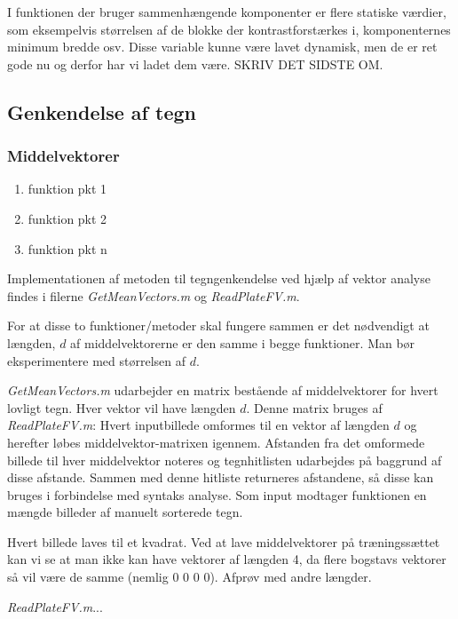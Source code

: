 I funktionen der bruger sammenhængende komponenter er flere statiske værdier, som eksempelvis størrelsen af de blokke der kontrastforstærkes i, komponenternes minimum bredde osv. Disse variable kunne være lavet dynamisk, men de er ret gode nu og derfor har vi ladet dem være. SKRIV DET SIDSTE OM.



\subsection{Genkendelse af tegn}

\subsubsection{Middelvektorer}

\begin{enumerate}
\item funktion pkt 1
\item funktion pkt 2
\item funktion pkt n
\end{enumerate}

Implementationen af metoden til tegngenkendelse ved hjælp af vektor analyse findes i filerne \textit{GetMeanVectors.m} og \textit{ReadPlateFV.m}.

For at disse to funktioner/metoder skal fungere sammen er det nødvendigt at længden, $d$ af middelvektorerne er den samme i begge funktioner. Man bør eksperimentere med størrelsen af $d$.

\textit{GetMeanVectors.m} udarbejder en matrix bestående af middelvektorer for hvert lovligt tegn. Hver vektor vil have længden $d$. Denne matrix bruges af \textit{ReadPlateFV.m}: Hvert inputbillede omformes til en vektor af længden $d$ og herefter løbes middelvektor-matrixen igennem. Afstanden fra det omformede billede til hver middelvektor noteres og tegnhitlisten udarbejdes på baggrund af disse afstande. Sammen med denne hitliste returneres afstandene, så disse kan bruges i forbindelse med syntaks analyse.
Som input modtager funktionen en mængde billeder af manuelt sorterede tegn.

Hvert billede laves til et kvadrat. Ved at lave middelvektorer på træningssættet kan vi se at man ikke kan have vektorer af længden 4, da flere bogstavs vektorer så vil være de samme (nemlig 0 0 0 0). Afprøv med andre længder.

\textit{ReadPlateFV.m}...

